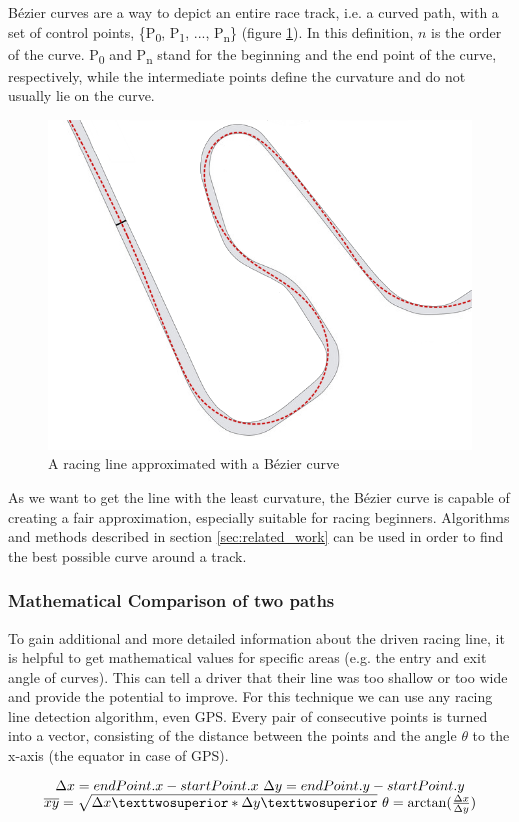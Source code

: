 Bézier curves are a way to depict an entire race track, i.e. a curved path, with a set of control points, \{P\textsubscript{0}, P\textsubscript{1}, ..., P\textsubscript{n}\} (figure \ref{fig:bezier}). In this definition, $n$ is the order of the curve. P\textsubscript{0} and P\textsubscript{n} stand for the beginning and the end point of the curve, respectively, while the intermediate points define the curvature and do not usually lie on the curve.

\begin{figure}[!ht]
\centering
\includegraphics[width=.65\textwidth]{bezier_track}
\caption{A racing line approximated with a Bézier curve}
\label{fig:bezier}
\end{figure}


As we want to get the line with the least curvature, the Bézier curve is capable of creating a fair approximation, especially suitable for racing beginners.
Algorithms and methods described in section \ref{sec:related_work} can be used in order to find the best possible curve around a track.

\subsubsection{Mathematical Comparison of two paths}
To gain additional and more detailed information about the driven racing line, it is helpful to get mathematical values for specific areas (e.g. the entry and exit angle of curves). This can tell a driver that their line was too shallow or too wide and provide the potential to improve.
For this technique we can use any racing line detection algorithm, even GPS. 
Every pair of consecutive points is turned into a vector, consisting of the distance between the points and the angle $\theta$ to the x-axis (the equator in case of GPS).

\begin{equation}
\begin{minipage}{\textwidth}
\begin{center}
$\Delta x = endPoint.x - startPoint.x$

$\Delta y = endPoint.y - startPoint.y$

$\overline{xy} = \sqrt{\Delta x² * \Delta y²}$

$\theta = \arctan(\frac{\Delta x}{\Delta y})$ 
\end{center}
\end{minipage}
\label{eq:vector_calc}
\end{equation}

